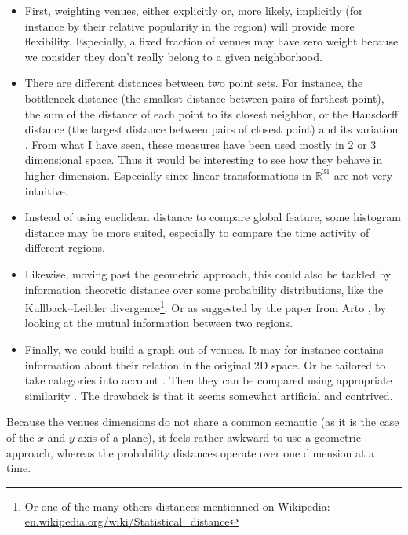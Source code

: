 \begin{itemize}
    \item First, weighting venues, either explicitly or, more likely,
        implicitly (for instance by their relative popularity in the region)
        will provide more flexibility. Especially, a fixed fraction of venues
        may have zero weight because we consider they don't really belong to a
        given neighborhood.
    \item There are different distances between two point sets. For instance,
        the bottleneck distance \autocite{Bottleneck96} (the smallest distance
        between pairs of farthest point), the sum of the distance of each
        point to its closest neighbor, or the Hausdorff distance (the largest
        distance between pairs of closest point) and its variation
        \autocite{ModifiedHausdorff94}. From what I have seen, these measures
        have been used mostly in 2 or 3 dimensional space.  Thus it would be
        interesting to see how they behave in higher dimension.  Especially
        since linear transformations in $\mathbb{R}^{31}$ are not very
        intuitive.
    \item Instead of using euclidean distance to compare global feature, some
	    histogram distance \autocite{HistogramDistance02} may be more suited,
        especially to compare the time activity of different regions.
    \item Likewise, moving past the geometric approach, this could also be
        tackled by information theoretic distance over some probability
        distributions, like the Kullback--Leibler divergence\footnote{Or one
        of the many others distances mentionned on Wikipedia:
        \href{https://en.wikipedia.org/wiki/Statistical_distance}%
        {\url{en.wikipedia.org/wiki/Statistical_distance}}}. Or as suggested
        by the paper from Arto \autocite{InfoMatching10}, by looking at the
        mutual information between two regions.
    \item Finally, we could build a graph out of venues. It may for instance
        contains information about their relation in the original 2D space. Or
        be tailored to take categories into account \autocite{fitting09}. Then
        they can be compared using appropriate similarity
        \autocite{GraphSimilarity14}. The drawback is that it seems somewhat
        artificial and contrived.
\end{itemize}

Because the venues dimensions do not share a common semantic (as it is the case
of the $x$ and $y$ axis of a plane), it feels rather awkward to use a geometric
approach, whereas the probability distances operate over one dimension at a
time.

